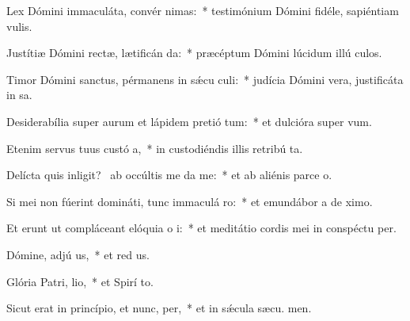 \item Lex Dómini immaculáta, convér nimas:~* testimónium Dómini fidéle, sapiéntiam  vulis.
\item Justítiæ Dómini rectæ, lætificán da:~* præcéptum Dómini lúcidum illú culos.
\item Timor Dómini sanctus, pérmanens in sǽcu culi:~* judícia Dómini vera, justificáta in sa.
\item Desiderabília super aurum et lápidem pretió tum:~* et dulcióra super   vum.
\item Etenim servus tuus custó a,~* in custodiéndis illis retribú ta.
\item Delícta quis inligit?~\pscross{} ab occúltis me da me:~* et ab aliénis parce  o.
\item Si mei non fúerint domináti, tunc immaculá ro:~* et emundábor a de ximo.
\item Et erunt ut compláceant elóquia o i:~* et meditátio cordis mei in conspéctu  per.
\item Dómine, adjú us,~* et red us.
\item Glória Patri,  lio,~* et Spirí to.
\item Sicut erat in princípio, et nunc,  per,~* et in sǽcula sæcu. men.
